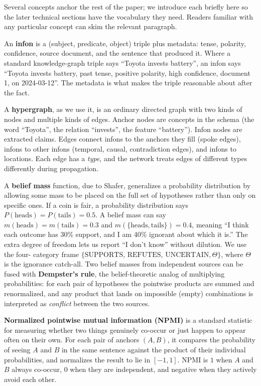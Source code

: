 \documentclass[11pt,a4paper]{article}
\begin{document}
Several concepts anchor the rest of the paper; we introduce each
briefly here so the later technical sections have the vocabulary
they need. Readers familiar with any particular concept can skim
the relevant paragraph.

An \textbf{infon} is a (subject, predicate, object) triple plus
metadata: tense, polarity, confidence, source document, and the
sentence that produced it. Where a standard knowledge-graph triple
says ``Toyota invests battery'', an infon says ``Toyota invests
battery, past tense, positive polarity, high confidence, document
1, on 2024-03-12''. The metadata is what makes the triple
reasonable about after the fact.

A \textbf{hypergraph}, as we use it, is an ordinary directed graph
with two kinds of nodes and multiple kinds of edges. Anchor nodes
are concepts in the schema (the word ``Toyota'', the relation
``invests'', the feature ``battery''). Infon nodes are extracted
claims. Edges connect infons to the anchors they fill (spoke
edges), infons to other infons (temporal, causal, contradiction
edges), and infons to locations. Each edge has a \textit{type},
and the network treats edges of different types differently during
propagation.

A \textbf{belief mass} function, due to Shafer, generalizes a
probability distribution by allowing some mass to be placed on the
full set of hypotheses rather than only on specific ones. If a
coin is fair, a probability distribution says $P(\text{heads}) =
P(\text{tails}) = 0.5$. A belief mass can say $m(\text{heads}) =
m(\text{tails}) = 0.3$ and $m(\{\text{heads},\text{tails}\}) =
0.4$, meaning ``I think each outcome has 30\% support, and I am
40\% ignorant about which it is.'' The extra degree of freedom
lets us report ``I don't know'' without dilution. We use the four-
category frame $\{\text{SUPPORTS, REFUTES, UNCERTAIN}, \Theta\}$,
where $\Theta$ is the ignorance catch-all. Two belief masses from
independent sources can be fused with \textbf{Dempster's rule},
the belief-theoretic analog of multiplying probabilities: for each
pair of hypotheses the pointwise products are summed and
renormalized, and any product that lands on impossible (empty)
combinations is interpreted as \textit{conflict} between the two
sources.

\textbf{Normalized pointwise mutual information (NPMI)} is a
standard statistic for measuring whether two things genuinely
co-occur or just happen to appear often on their own. For each
pair of anchors $(A, B)$, it compares the probability of seeing
$A$ and $B$ in the same sentence against the product of their
individual probabilities, and normalizes the result to lie in
$[-1, 1]$. NPMI is $1$ when $A$ and $B$ always co-occur, $0$ when
they are independent, and negative when they actively avoid each
other.
\end{document}
